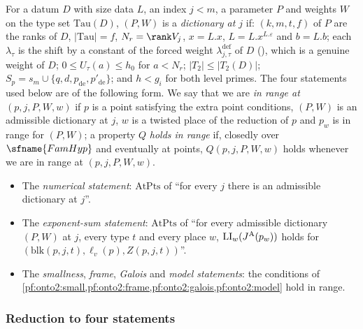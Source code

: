 \begin{definition}[Dictionaries]\label{pf:onto2:dictdef}
For a datum $D$ with size data $L$, an index $j<m$, a parameter $P$ and weights $W$ on the type set $\mathrm{Tau}(D)$, $(P,W)$ is a
\emph{dictionary at $j$} if: $(k,m,t,f)$ of $P$ are the ranks of $D$, $|\mathrm{Tau}|=f$,
$N_r=\rank V_j$, $x=L.x$, $L=L.x^{L.\varepsilon}$ and $b=L.b$; each $\lambda_\tau$ is the shift by a constant of the forced weight
$\lambda^{\mathrm{def}}_{j,\tau}$ of $D$ (), which is a genuine weight of $D$; $0\le
U_\tau(a)\le h_0$ for $a<N_r$; $|T_2|\le|T_2(D)|$; $S_p=s_m\cup\{q,d,p_{\mathrm{de}},p'_{\mathrm{de}}\}$; and $h<g_i$ for both level
primes. The four statements used below are of the following form. We say that we are \emph{in range at $(p,j,P,W,w)$} if $p$ is a
point satisfying the extra point conditions, $(P,W)$ is an admissible dictionary at $j$, $w$ is a twisted place of the reduction of $p$
and $p_w$ is in range for $(P,W)$; a property $Q$ \emph{holds in range} if, closedly over $\sfname{FamHyp}$ and eventually at points,
$Q(p,j,P,W,w)$ holds whenever we are in range at $(p,j,P,W,w)$.
\begin{itemize}
\item The \emph{numerical statement}: $\mathrm{AtPts}$ of ``for every $j$ there is an admissible dictionary at $j$''.
\item The \emph{exponent-sum statement}: $\mathrm{AtPts}$ of ``for every admissible dictionary $(P,W)$ at $j$, every type $t$ and every
  place $w$, $\mathrm{LI}_w(J^{\mathrm{A}}(p_w))$ holds for $(\mathrm{blk}(p,j,t),\ell_v(p),Z(p,j,t))$''.
\item The \emph{smallness}, \emph{frame}, \emph{Galois} and \emph{model statements}: the conditions of
  \cref{pf:onto2:small,pf:onto2:frame,pf:onto2:galois,pf:onto2:model} hold in range.
\end{itemize}
\end{definition}

\subsubsection{Reduction to four statements}\label{sec:pf:onto2:red}

